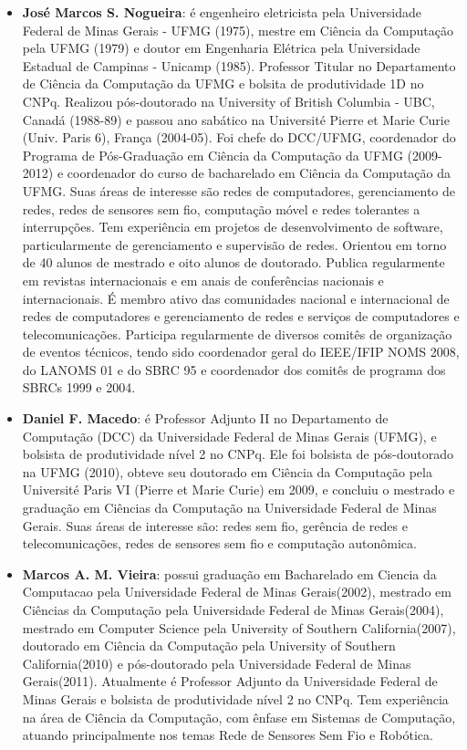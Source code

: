 \documentclass{SBCbookchapter}
\begin{document}
\begin{itemize}
\item \textbf{José Marcos S. Nogueira}: é engenheiro eletricista pela Universidade Federal de Minas Gerais - UFMG (1975), mestre em Ciência da Computação pela UFMG (1979) e doutor em Engenharia Elétrica pela Universidade Estadual de Campinas - Unicamp (1985). Professor Titular no Departamento de Ciência da Computação da UFMG e bolsita de produtividade 1D no CNPq. Realizou pós-doutorado na University of British Columbia - UBC, Canadá (1988-89) e passou ano sabático na Université Pierre et Marie Curie (Univ. Paris 6), França (2004-05). Foi chefe do DCC/UFMG, coordenador do Programa de Pós-Graduação em Ciência da Computação da UFMG (2009-2012) e coordenador do curso de bacharelado em Ciência da Computação da UFMG. Suas áreas de interesse são redes de computadores, gerenciamento de redes, redes de sensores sem fio, computação móvel e redes tolerantes a interrupções. Tem experiência em projetos de desenvolvimento de software, particularmente de gerenciamento e supervisão de redes. Orientou em torno de 40 alunos de mestrado e oito alunos de doutorado. Publica regularmente em revistas internacionais e em anais de conferências nacionais e internacionais. É membro ativo das comunidades nacional e internacional de redes de computadores e gerenciamento de redes e serviços de computadores e telecomunicações. Participa regularmente de diversos comitês de organização de eventos técnicos, tendo sido coordenador geral do IEEE/IFIP NOMS 2008, do LANOMS 01 e do SBRC 95 e coordenador dos comitês de programa dos SBRCs 1999 e 2004.

\item \textbf{Daniel F. Macedo}: é Professor Adjunto II no Departamento de Computação (DCC) da Universidade Federal de Minas Gerais (UFMG), e bolsista de produtividade nível 2 no CNPq. Ele foi bolsista de pós-doutorado na UFMG (2010), obteve seu doutorado em Ciência da Computação pela Université Paris VI (Pierre et Marie Curie) em 2009, e concluiu o mestrado e graduação em Ciências da Computação na Universidade Federal de Minas Gerais. Suas áreas de interesse são: redes sem fio, gerência de redes e telecomunicações, redes de sensores sem fio e computação autonômica.

\item \textbf{Marcos A. M. Vieira}: possui graduação em Bacharelado em Ciencia da Computacao pela Universidade Federal de Minas Gerais(2002), mestrado em Ciências da Computação pela Universidade Federal de Minas Gerais(2004), mestrado em Computer Science pela University of Southern California(2007), doutorado em Ciência da Computação pela University of Southern California(2010) e pós-doutorado pela Universidade Federal de Minas Gerais(2011). Atualmente é Professor Adjunto da Universidade Federal de Minas Gerais e bolsista de produtividade nível 2 no CNPq. Tem experiência na área de Ciência da Computação, com ênfase em Sistemas de Computação, atuando principalmente nos temas Rede de Sensores Sem Fio e Robótica.


\end{itemize}
\end{document}
